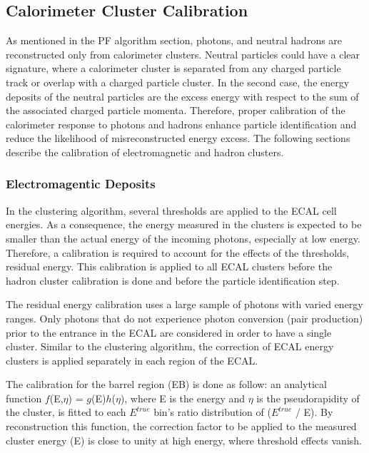 \subsection{Calorimeter Cluster Calibration}
\label{subsec:calibration}
As mentioned in the PF algorithm section, photons, and neutral hadrons are reconstructed only from calorimeter clusters.
Neutral particles could have a clear signature, where a calorimeter cluster is separated from any charged particle track or overlap with a charged particle cluster.
In the second case, the energy deposits of the neutral particles are the excess energy with respect to the sum of the associated charged particle momenta. Therefore, proper calibration of the calorimeter response to photons and hadrons enhance particle identification and reduce the likelihood of misreconstructed energy excess.
The following sections describe the calibration of electromagnetic and hadron clusters.

\subsubsection{Electromagentic Deposits}

In the clustering algorithm, several thresholds are applied to the ECAL cell energies.%
As a consequence, the energy measured in the clusters is expected to be smaller than the actual energy of the incoming photons, especially at low energy.
Therefore, a calibration is required to account for the effects of the thresholds, residual energy.
This calibration is applied to all ECAL clusters before the hadron cluster calibration is done and before the particle identification step.

The residual energy calibration uses a large sample of photons with varied energy ranges.
Only photons that do not experience photon conversion (pair production) prior to the entrance in the ECAL are considered in order to have a single cluster.
Similar to the clustering algorithm, the correction of ECAL energy clusters is applied separately in each region of the ECAL.

The calibration for the barrel region (EB) is done as follow:  an analytical function $f$(E,$\eta$) = $g$(E)$h$($\eta$), where E is the energy and $\eta$ is the pseudorapidity of the cluster, is fitted to each $E^{true}$ bin's ratio distribution of ($E^{true}$ / E).
By reconstruction this function, the correction factor to be applied to the measured cluster energy (E) is close to unity at high energy, where threshold effects vanish.


